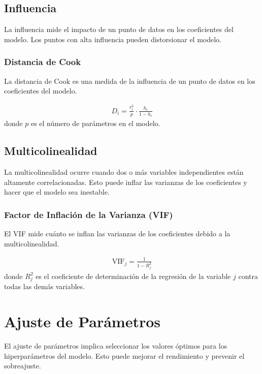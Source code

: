 \documentclass[a4paper]{report} %
\begin{document}
\subsection{Influencia}

La influencia mide el impacto de un punto de datos en los coeficientes del modelo. Los puntos con alta influencia pueden distorsionar el modelo.

\subsubsection{Distancia de Cook}

La distancia de Cook es una medida de la influencia de un punto de datos en los coeficientes del modelo.

\begin{eqnarray*}
D_i = \frac{r_i^2}{p} \cdot \frac{h_i}{1 - h_i}
\end{eqnarray*}
donde $p$ es el n\'umero de par\'ametros en el modelo.

\subsection{Multicolinealidad}

La multicolinealidad ocurre cuando dos o m\'as variables independientes est\'an altamente correlacionadas. Esto puede inflar las varianzas de los coeficientes y hacer que el modelo sea inestable.

\subsubsection{Factor de Inflaci\'on de la Varianza (VIF)}

El VIF mide cu\'anto se inflan las varianzas de los coeficientes debido a la multicolinealidad.

\begin{eqnarray*}
\text{VIF}_j = \frac{1}{1 - R_j^2}
\end{eqnarray*}
donde $R_j^2$ es el coeficiente de determinaci\'on de la regresi\'on de la variable $j$ contra todas las dem\'as variables.

\section{Ajuste de Par\'ametros}

El ajuste de par\'ametros implica seleccionar los valores \'optimos para los hiperpar\'ametros del modelo. Esto puede mejorar el rendimiento y prevenir el sobreajuste.
\end{document}

